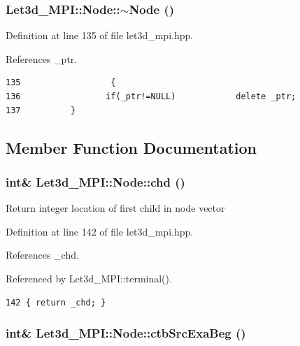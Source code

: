 \subsubsection{\setlength{\rightskip}{0pt plus 5cm}Let3d\_\-MPI::Node::$\sim$Node ()\hspace{0.3cm}{\tt  [inline]}}\label{classLet3d__MPI_1_1Node_cb9f183fa6855dd10f3e01bce1a87a15_cb9f183fa6855dd10f3e01bce1a87a15}




Definition at line 135 of file let3d\_\-mpi.hpp.

References \_\-ptr.

\footnotesize\begin{verbatim}135                  {
136                 if(_ptr!=NULL)            delete _ptr;
137          }
\end{verbatim}\normalsize 




\subsection{Member Function Documentation}
\subsubsection{\setlength{\rightskip}{0pt plus 5cm}int\& Let3d\_\-MPI::Node::chd ()\hspace{0.3cm}{\tt  [inline]}}\label{classLet3d__MPI_1_1Node_8bd633985ededb26fd082d019896fec0_8bd633985ededb26fd082d019896fec0}


Return integer location of first child in node vector 

Definition at line 142 of file let3d\_\-mpi.hpp.

References \_\-chd.

Referenced by Let3d\_\-MPI::terminal().

\footnotesize\begin{verbatim}142 { return _chd; }
\end{verbatim}\normalsize 


\subsubsection{\setlength{\rightskip}{0pt plus 5cm}int\& Let3d\_\-MPI::Node::ctb\-Src\-Exa\-Beg ()\hspace{0.3cm}{\tt  [inline]}}\label{classLet3d__MPI_1_1Node_784586f551a89546a75eb3a834e40580_784586f551a89546a75eb3a834e40580}


